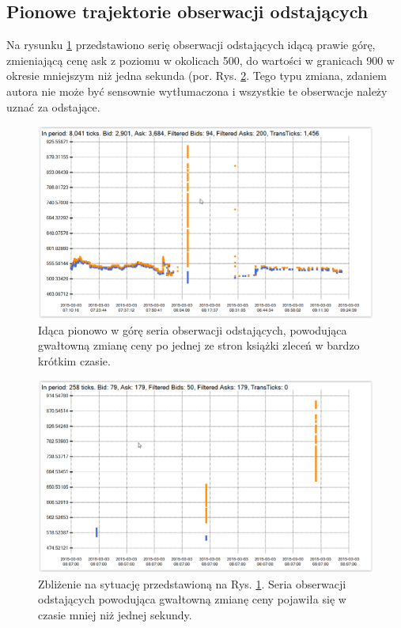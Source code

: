 \documentclass[a4paper,12pt,openany, DIV=calc, headsepline]{scrbook}
\begin{document}
\subsection{Pionowe trajektorie obserwacji odstających}

Na rysunku \ref{fig:fCNH15} przedstawiono serię obserwacji odstających idącą prawie górę, zmieniającą cenę ask z poziomu w okolicach 500, do wartości w granicach 900 w okresie mniejszym niż jedna sekunda (por. Rys. \ref{fig:fCNH15ZOOM}. Tego typu zmiana, zdaniem autora nie może być sensownie wytłumaczona i wszystkie te obserwacje należy uznać za odstające.

\begin{figure}[H]
  \centering
  \includegraphics[scale=0.5]{wykresy/fCNH15.PNG}
  \caption{Idąca pionowo w górę seria obserwacji odstających, powodująca gwałtowną zmianę ceny po jednej ze stron książki zleceń w bardzo krótkim czasie.}
  \label{fig:fCNH15}
\end{figure}

\begin{figure}[H]
  \centering
  \includegraphics[scale=0.5]{wykresy/fCNH15ZOOM.PNG}
  \caption{Zbliżenie na sytuację przedstawioną na Rys. \ref{fig:fCNH15}. Seria obserwacji odstających powodująca gwałtowną zmianę ceny pojawiła się w czasie mniej niż jednej sekundy.}
  \label{fig:fCNH15ZOOM}
\end{figure}
\end{document}
